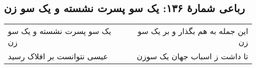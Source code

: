 \begin{center}
\section*{رباعی شمارهٔ ۱۳۶: یک سو پسرت نشسته و یک سو زن}
\label{sec:136}
\begin{longtable}{l p{0.5cm} r}
یک سو پسرت نشسته و یک سو زن
&&
این جمله به هم بگذار و بر یک سو زن
\\
عیسی نتوانست بر افلاک رسید
&&
تا داشت ز اسباب جهان یک سوزن
\\
\end{longtable}
\end{center}
